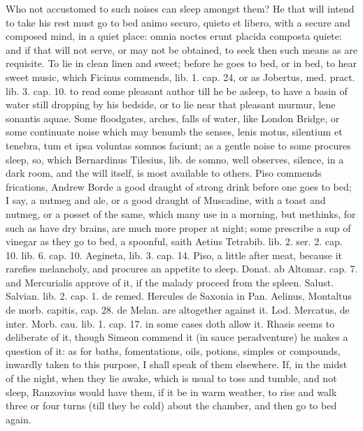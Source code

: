 {Who not accustomed to such noises can sleep amongst them? He that will
intend to take his rest must go to bed animo securo, quieto et libero,
with a secure and composed mind, in a quiet place: omnia noctes
erunt placida composta quiete: and if that will not serve, or may not
be obtained, to seek then such means as are requisite. To lie in clean
linen and sweet; before he goes to bed, or in bed, to hear sweet
music, which Ficinus commends, lib. 1. cap. 24, or as Jobertus, med.
pract. lib. 3. cap. 10. to read some pleasant author till he be
asleep, to have a basin of water still dropping by his bedside, or to
lie near that pleasant murmur, lene sonantis aquae. Some floodgates,
arches, falls of water, like London Bridge, or some continuate noise
which may benumb the senses, lenis motus, silentium et tenebra, tum et
ipsa voluntas somnos faciunt; as a gentle noise to some procures sleep,
so, which Bernardinus Tilesius, lib. de somno, well observes, silence,
in a dark room, and the will itself, is most available to others. Piso
commends frications, Andrew Borde a good draught of strong drink before
one goes to bed; I say, a nutmeg and ale, or a good draught of
Muscadine, with a toast and nutmeg, or a posset of the same, which many
use in a morning, but methinks, for such as have dry brains, are much
more proper at night; some prescribe a  sup of vinegar as they go
to bed, a spoonful, saith Aetius Tetrabib. lib. 2. ser. 2. cap. 10.
lib. 6. cap. 10. Aegineta, lib. 3. cap. 14. Piso, a little after meat,
because it rarefies melancholy, and procures an appetite to
sleep. Donat. ab Altomar. cap. 7. and Mercurialis approve of it, if the
malady proceed from the spleen. Salust. Salvian. lib. 2. cap. 1.
de remed. Hercules de Saxonia in Pan. Aelinus, Montaltus de morb.
capitis, cap. 28. de Melan. are altogether against it. Lod. Mercatus,
de inter. Morb. cau. lib. 1. cap. 17. in some cases doth allow it.
Rhasis seems to deliberate of it, though Simeon commend it (in
sauce peradventure) he makes a question of it: as for baths,
fomentations, oils, potions, simples or compounds, inwardly taken to
this purpose,  I shall speak of them elsewhere. If, in the midst
of the night, when they lie awake, which is usual to toss and tumble,
and not sleep,  Ranzovius would have them, if it be in warm
weather, to rise and walk three or four turns (till they be cold) about
the chamber, and then go to bed again.
}

